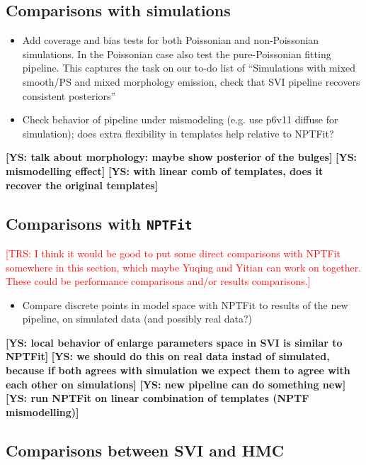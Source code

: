 \documentclass[prd,aps,10pt,nofootinbib,twocolumn,superscriptaddress,preprintnumbers,balancelastpage,longbibliography,floatfix]{revtex4-2}
\def\trs#1{\textcolor{red}{[TRS: #1]}}
\newcommand{\ys}[1]{{\color{overleaf} {\bf [YS: #1]}}}
\begin{document}
\subsection{Comparisons with simulations}

\begin{itemize}
\item Add coverage and bias tests for both Poissonian and non-Poissonian simulations. In the Poissonian case also test the pure-Poissonian fitting pipeline. This captures the task on our to-do list of ``Simulations with mixed smooth/PS and mixed morphology emission, check that SVI pipeline recovers consistent posteriors''
\item Check behavior of pipeline under mismodeling (e.g. use p6v11 diffuse for simulation); does extra flexibility in templates help relative to NPTFit?
\end{itemize}


\ys{talk about morphology: maybe show posterior of the bulges}
\ys{mismodelling effect}
\ys{with linear comb of templates, does it recover the original templates}




\subsection{Comparisons with \texttt{NPTFit}}

\trs{I think it would be good to put some direct comparisons with NPTFit somewhere in this section, which maybe Yuqing and Yitian can work on together. These could be performance comparisons and/or results comparisons.}

\begin{itemize}
\item Compare discrete points in model space with NPTFit to results of the new pipeline, on simulated data (and possibly real data?)
\end{itemize}

\ys{local behavior of enlarge parameters space in SVI is similar to NPTFit}
\ys{we should do this on real data instad of simulated, because if both agrees with simulation we expect them to agree with each other on simulations}
\ys{new pipeline can do something new}
\ys{run NPTFit on linear combination of templates (NPTF mismodelling)}

\subsection{Comparisons between SVI and HMC}	
\end{document}
